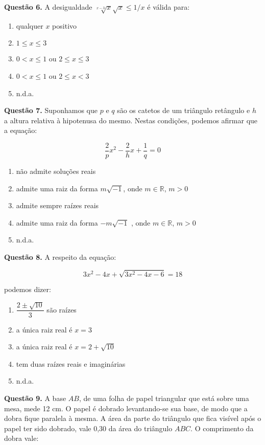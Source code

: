 \documentclass[11pt]{article}
\begin{document}
\textbf{Questão 6.} A desigualdade $\sqrt[x-3]{x} \sqrt{x} \leq 1/x$ é válida para:

\begin{enumerate}[\bf A (\quad)]
    \item qualquer $x$ positivo
    \item $1 \leq x \leq 3$
    \item $0 < x \leq 1$ ou $2 \leq x \leq 3$
    \item $0 < x \leq 1$ ou $2 \leq x < 3$
    \item n.d.a.
\end{enumerate}

\textbf{Questão 7.} Suponhamos que $p$ e $q$ são os catetos de um triângulo retângulo  e  $h$  a  altura  relativa  à  hipotenusa  do  mesmo.  Nestas condições, podemos afirmar que a equação:

$$
\frac{2}{p} x^2 - \frac{2}{h} x + \frac{1}{q} = 0
$$

\begin{enumerate}[\bf A (\quad)]
    \item não admite soluções reais
    \item admite uma raiz da forma $m\sqrt{-1}$, onde $m \in \mathbb{R}$, $m > 0$
    \item admite sempre raízes reais
    \item admite uma raiz da forma $-m\sqrt{-1}$ , onde $m \in \mathbb{R}$, $m > 0$
    \item n.d.a.
\end{enumerate}

\textbf{Questão 8.} A respeito da equação: 

$$
3x^2 - 4x + \sqrt{3x^2 - 4x - 6} = 18
$$

podemos dizer:

\begin{enumerate}[\bf A (\quad)]
    \item $\dfrac{2 \pm \sqrt{10}}{3}$ são raízes 
    \item a única raiz real é $x = 3$
    \item a única raiz real é $x = 2 + \sqrt{10}$
    \item tem duas raízes reais e imaginárias 
    \item n.d.a.
\end{enumerate}

\textbf{Questão 9.} A base $AB$, de uma folha de papel triangular que está sobre   uma   mesa,   mede   12   cm.   O   papel   é   dobrado   levantando-se  sua  base,  de  modo  que  a  dobra  fique  paralela  à  mesma.  A  área  da  parte  do  triângulo  que  fica  visível após o papel ter sido dobrado, vale 0,30 da área do triângulo $ABC$. O comprimento da dobra vale: 
\end{document}
